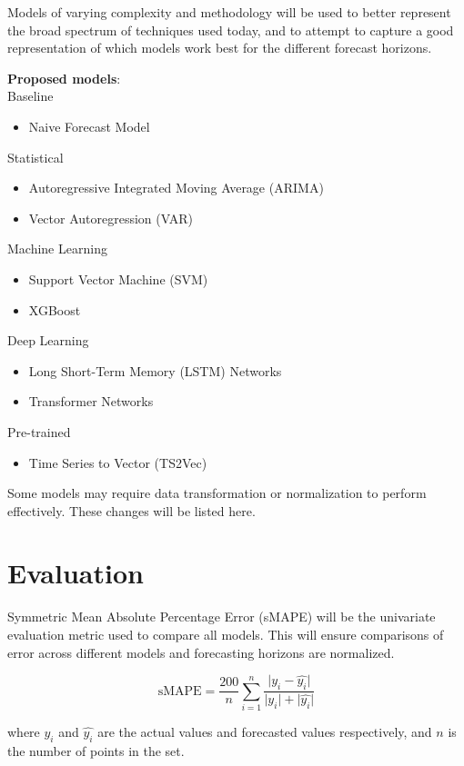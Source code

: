 \documentclass[sigconf]{acmart}
\begin{document}
Models of varying complexity and methodology will be used to better represent the broad spectrum of techniques used today, and to attempt to capture a good representation of which models work best for the different forecast horizons. 

\textbf{Proposed models}:
\\
Baseline
\begin{itemize}
    \item{Naive Forecast Model}
\end{itemize}
Statistical
\begin{itemize}
    \item{Autoregressive Integrated Moving Average (ARIMA)}
    \item{Vector Autoregression (VAR)}
\end{itemize}
Machine Learning
\begin{itemize}
    \item{Support Vector Machine (SVM)}
    \item{XGBoost}
\end{itemize}
Deep Learning
\begin{itemize}
    \item{Long Short-Term Memory (LSTM) Networks}
    \item{Transformer Networks}
\end{itemize}
Pre-trained
\begin{itemize}
    \item{Time Series to Vector (TS2Vec)}
\end{itemize}

Some models may require data transformation or normalization to perform effectively. These changes will be listed here.

\section{Evaluation}
Symmetric Mean Absolute Percentage Error (sMAPE) will be the univariate evaluation metric used to compare all models. This will ensure comparisons of error across different models and forecasting horizons are normalized. 

\begin{equation}
\text{sMAPE} =\frac{200}{n}\sum_{i=1}^{n}\frac{\lvert y_i - \hat{y_i} \rvert}{\lvert y_i \rvert + \lvert \hat{y_i} \rvert}
\end{equation}

where $y_i$ and $\hat{y_i}$ are the actual values and forecasted values respectively, and $n$ is the number of points in the set.
\end{document}
